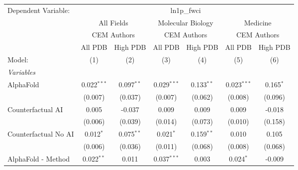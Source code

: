 \begingroup
\centering
\begin{tabular}{lcccccc}
   \tabularnewline \midrule \midrule
   Dependent Variable: & \multicolumn{6}{c}{ln1p\_fwci}\\
 & \multicolumn{2}{c}{All Fields} & \multicolumn{2}{c}{Molecular Biology} & \multicolumn{2}{c}{Medicine} \\
\cmidrule(lr){2-3} \cmidrule(lr){4-5} \cmidrule(lr){6-7}
 & \multicolumn{2}{c}{CEM Authors} & \multicolumn{2}{c}{CEM Authors} & \multicolumn{2}{c}{CEM Authors} \\
\cmidrule(lr){2-3} \cmidrule(lr){4-5} \cmidrule(lr){6-7}
 & \multicolumn{1}{c}{All PDB} & \multicolumn{1}{c}{High PDB} & \multicolumn{1}{c}{All PDB} & \multicolumn{1}{c}{High PDB} & \multicolumn{1}{c}{All PDB} & \multicolumn{1}{c}{High PDB} \\
\cmidrule(lr){2-2} \cmidrule(lr){3-3} \cmidrule(lr){4-4} \cmidrule(lr){5-5} \cmidrule(lr){6-6} \cmidrule(lr){7-7}
   Model:                                                     & (1)            & (2)          & (3)           & (4)          & (5)            & (6)\\  
   \midrule
   \emph{Variables}\\
   AlphaFold                                                  & 0.022$^{***}$  & 0.097$^{**}$ & 0.029$^{***}$ & 0.133$^{**}$ & 0.023$^{***}$  & 0.165$^{*}$\\   
                                                              & (0.007)        & (0.037)      & (0.007)       & (0.062)      & (0.008)        & (0.096)\\   
   Counterfactual AI                                          & 0.005          & -0.037       & 0.009         & 0.009        & 0.009          & -0.018\\   
                                                              & (0.006)        & (0.039)      & (0.014)       & (0.073)      & (0.010)        & (0.158)\\   
   Counterfactual No AI                                       & 0.012$^{*}$    & 0.075$^{**}$ & 0.021$^{*}$   & 0.159$^{**}$ & 0.010          & 0.105\\   
                                                              & (0.006)        & (0.036)      & (0.011)       & (0.068)      & (0.008)        & (0.068)\\   
   AlphaFold - Method                                         & 0.022$^{**}$   & 0.011        & 0.037$^{***}$ & 0.003        & 0.024$^{*}$    & -0.009\\   

\end{tabular}
